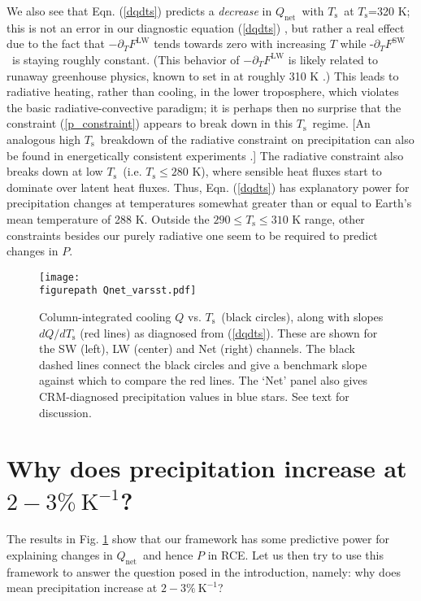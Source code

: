 \documentclass[9pt,twocolumn,twoside,lineno]{pnas-new}
\newcommand{\eqnref}[1]{(\ref{#1})}
\newcommand{\ppt}{\ensuremath{\partial_T}}
\newcommand{\Qnet}{\ensuremath{Q_\mathrm{net}}}
\newcommand{\FLW}{\ensuremath{F^\mathrm{LW}}}
\newcommand{\FSW}{\ensuremath{F^\mathrm{SW}}}
\newcommand{\Ts}{\ensuremath{T_\mathrm{s}}}
\newcommand{\Kinverse}{\ensuremath{\mathrm{K^{-1}}}}
\newcommand{\figurepath}{../../figures/}
\begin{document}
We also see that  Eqn. \eqnref{dqdts} predicts a \emph{decrease} in  \Qnet\ with \Ts\ at \Ts=320 K; this is not an error in our diagnostic equation \eqnref{dqdts} , but rather a real effect due to the fact that $-\ppt \FLW$ tends towards zero with increasing $T$  while -\ppt \FSW\ is staying roughly constant. (This behavior of $-\ppt \FLW$ is likely related to runaway greenhouse physics, known to set in at roughly 310 K \cite{goldblatt2013}.) This leads to radiative heating, rather than cooling, in the  lower troposphere, which violates the basic radiative-convective paradigm; it is perhaps then no surprise that the constraint \eqnref{p_constraint} appears to break down in this \Ts\ regime. [An analogous high \Ts\ breakdown of the radiative constraint on precipitation can also be found in energetically consistent experiments \cite{lehir2009, pierrehumbert1999}.]  The radiative  constraint  also breaks down at low \Ts\ (i.e. $\Ts \leq 280$ K), where sensible heat fluxes start to dominate over latent heat fluxes. Thus, Eqn. \eqnref{dqdts} has explanatory power for  precipitation changes at  temperatures somewhat greater than or equal to Earth's mean temperature of 288 K. Outside the $290\leq \Ts \leq 310$ K range, other constraints besides our purely radiative one seem to be required to predict changes in $P$.

\begin{figure}[t]
	\begin{center}
			\texttt{[image: \\figurepath Qnet\_varsst.pdf]}
		\caption{Column-integrated cooling $Q$ vs. \Ts\ (black circles), along with slopes $d Q/d \Ts$ (red lines) as diagnosed from \eqnref{dqdts}. These are shown for the SW (left), LW (center) and Net (right) channels.  The black dashed lines connect the black circles and give a benchmark slope against which to compare the red lines. The `Net' panel also gives CRM-diagnosed precipitation values in blue stars. See text for discussion.
		\label{Qnet_varsst}
		}
	\end{center}
\end{figure}



\section{Why does precipitation increase at $2 -3\%\ \Kinverse$?} \label{sec_1percent}
The results in Fig. \ref{Qnet_varsst} show that our framework  has some predictive power for explaining changes in \Qnet\ and hence $P$ in RCE. Let us then try to use this framework to answer the question posed in the introduction, namely: why does mean precipitation increase at $2 -3\%\ \Kinverse$?
\end{document}
